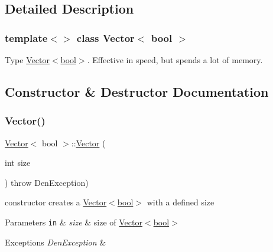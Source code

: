 \subsection{Detailed Description}
\subsubsection*{template$<$$>$\newline
class Vector$<$ bool $>$}

Type \hyperlink{classVector_3_01bool_01_4}{Vector$<$bool$>$}. Effective in speed, but spends a lot of memory. 

\subsection{Constructor \& Destructor Documentation}
\mbox{\label{classVector_3_01bool_01_4_ad097ece2d95bca611f81522a6cd2f054}} 
\subsubsection{\texorpdfstring{Vector()}{Vector()}\hspace{0.1cm}{\footnotesize\ttfamily [1/5]}}
{\footnotesize\ttfamily \hyperlink{classVector}{Vector}$<$ bool $>$\+::\hyperlink{classVector}{Vector} (\begin{DoxyParamCaption}\item[{int}]{size }\end{DoxyParamCaption}) throw  Den\+Exception) }



constructor  creates a \hyperlink{classVector_3_01bool_01_4}{Vector$<$bool$>$} with a defined size 


\begin{DoxyParams}[1]{Parameters}
\mbox{\tt in}  & {\em size} & size of \hyperlink{classVector_3_01bool_01_4}{Vector$<$bool$>$} \\
\hline
\end{DoxyParams}

\begin{DoxyExceptions}{Exceptions}
{\em Den\+Exception} & \\
\hline
\end{DoxyExceptions}
\mbox{\label{classVector_3_01bool_01_4_a1c11bbbd5699e7abaa5a4baf80e51efe}} 
